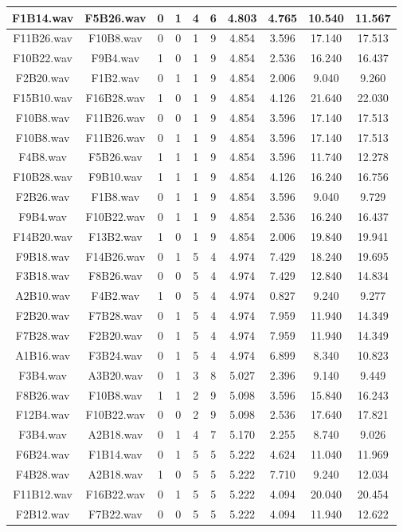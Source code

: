 \documentclass[11pt,a4paper]{book}
\begin{document}
\begin{longtable}[c]{|c|c|c|c|c|c|c|c|c|c|}
F1B14.wav&F5B26.wav&0&1&4&6&4.803&4.765&10.540&11.567\\ \hline
F11B26.wav&F10B8.wav&0&0&1&9&4.854&3.596&17.140&17.513\\ \hline
F10B22.wav&F9B4.wav&1&0&1&9&4.854&2.536&16.240&16.437\\ \hline
F2B20.wav&F1B2.wav&0&1&1&9&4.854&2.006&9.040&9.260\\ \hline
F15B10.wav&F16B28.wav&1&0&1&9&4.854&4.126&21.640&22.030\\ \hline
F10B8.wav&F11B26.wav&0&0&1&9&4.854&3.596&17.140&17.513\\ \hline
F10B8.wav&F11B26.wav&0&1&1&9&4.854&3.596&17.140&17.513\\ \hline
F4B8.wav&F5B26.wav&1&1&1&9&4.854&3.596&11.740&12.278\\ \hline
F10B28.wav&F9B10.wav&1&1&1&9&4.854&4.126&16.240&16.756\\ \hline
F2B26.wav&F1B8.wav&0&1&1&9&4.854&3.596&9.040&9.729\\ \hline
F9B4.wav&F10B22.wav&0&1&1&9&4.854&2.536&16.240&16.437\\ \hline
F14B20.wav&F13B2.wav&1&0&1&9&4.854&2.006&19.840&19.941\\ \hline
F9B18.wav&F14B26.wav&0&1&5&4&4.974&7.429&18.240&19.695\\ \hline
F3B18.wav&F8B26.wav&0&0&5&4&4.974&7.429&12.840&14.834\\ \hline
A2B10.wav&F4B2.wav&1&0&5&4&4.974&0.827&9.240&9.277\\ \hline
F2B20.wav&F7B28.wav&0&1&5&4&4.974&7.959&11.940&14.349\\ \hline
F7B28.wav&F2B20.wav&0&1&5&4&4.974&7.959&11.940&14.349\\ \hline
A1B16.wav&F3B24.wav&0&1&5&4&4.974&6.899&8.340&10.823\\ \hline
F3B4.wav&A3B20.wav&0&1&3&8&5.027&2.396&9.140&9.449\\ \hline
F8B26.wav&F10B8.wav&1&1&2&9&5.098&3.596&15.840&16.243\\ \hline
F12B4.wav&F10B22.wav&0&0&2&9&5.098&2.536&17.640&17.821\\ \hline
F3B4.wav&A2B18.wav&0&1&4&7&5.170&2.255&8.740&9.026\\ \hline
F6B24.wav&F1B14.wav&0&1&5&5&5.222&4.624&11.040&11.969\\ \hline
F4B28.wav&A2B18.wav&1&0&5&5&5.222&7.710&9.240&12.034\\ \hline
F11B12.wav&F16B22.wav&0&1&5&5&5.222&4.094&20.040&20.454\\ \hline
F2B12.wav&F7B22.wav&0&0&5&5&5.222&4.094&11.940&12.622\\ \hline

\end{longtable}
\end{document}
